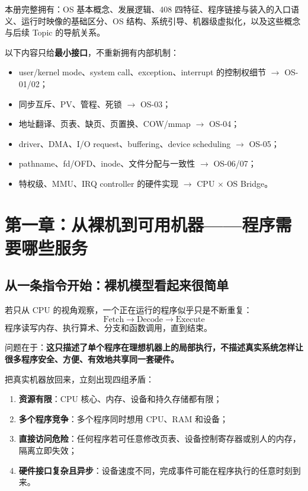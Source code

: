 \documentclass[11pt,a4paper]{ctexart}
\newcommand{\kw}[1]{\textbf{#1}}
\begin{document}
\begin{method}
本册完整拥有：OS 基本概念、发展逻辑、408 四特征、程序链接与装入的入口语义、运行时映像的基础区分、OS 结构、系统引导、机器级虚拟化，以及这些概念与后续 Topic 的导航关系。

以下内容只给\kw{最小接口}，不重新拥有内部机制：
\begin{itemize}
  \item user/kernel mode、system call、exception、interrupt 的控制权细节 $\rightarrow$ OS-01/02；
  \item 同步互斥、PV、管程、死锁 $\rightarrow$ OS-03；
  \item 地址翻译、页表、缺页、页置换、COW/mmap $\rightarrow$ OS-04；
  \item driver、DMA、I/O request、buffering、device scheduling $\rightarrow$ OS-05；
  \item pathname、fd/OFD、inode、文件分配与一致性 $\rightarrow$ OS-06/07；
  \item 特权级、MMU、IRQ controller 的硬件实现 $\rightarrow$ CPU $\times$ OS Bridge。
\end{itemize}
\end{method}

\tableofcontents
\newpage

\section{第一章：从裸机到可用机器——程序需要哪些服务}

\subsection{从一条指令开始：裸机模型看起来很简单}

若只从 CPU 的视角观察，一个正在运行的程序似乎只是不断重复：
\[
\boxed{\text{Fetch}\rightarrow\text{Decode}\rightarrow\text{Execute}}
\]
程序读写内存、执行算术、分支和函数调用，直到结束。

问题在于：\kw{这只描述了单个程序在理想机器上的局部执行，不描述真实系统怎样让很多程序安全、方便、有效地共享同一套硬件。}

把真实机器放回来，立刻出现四组矛盾：

\begin{enumerate}
  \item \kw{资源有限}：CPU 核心、内存、设备和持久存储都有限；
  \item \kw{多个程序竞争}：多个程序同时想用 CPU、RAM 和设备；
  \item \kw{直接访问危险}：任何程序若可任意修改页表、设备控制寄存器或别人的内存，隔离立即失效；
  \item \kw{硬件接口复杂且异步}：设备速度不同，完成事件可能在程序执行的任意时刻到来。
\end{enumerate}
\end{document}
